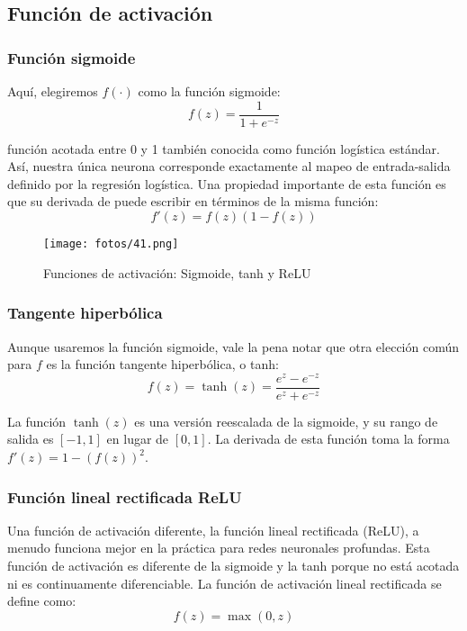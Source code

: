 \subsection{Función de activación}

\subsubsection{Función sigmoide}

\noindent Aquí, elegiremos $f(\cdot)$ como la función sigmoide:
\begin{equation}
f(z) = \frac{1}{1 + e^{-z}}
\end{equation}

\noindent función acotada entre 0 y 1 también conocida como función logística estándar. Así, nuestra única neurona corresponde exactamente al mapeo de entrada-salida definido por la regresión logística. Una propiedad importante de esta función es que su derivada de puede escribir en términos de la misma función:
\begin{equation}
f'(z) = f(z)(1 - f(z))
\end{equation}

\begin{figure}[h]
\centering
\texttt{[image: fotos/41.png]}
\caption{Funciones de activación: Sigmoide, tanh y ReLU}
\label{fig:7.2}
\end{figure}

\subsubsection{Tangente hiperbólica}

Aunque usaremos la función sigmoide, vale la pena notar que otra elección común para $f$ es la función tangente hiperbólica, o tanh:
\begin{equation}
f(z) = \tanh(z) = \frac{e^{z} - e^{-z}}{e^{z} + e^{-z}}
\end{equation}

La función $\tanh(z)$ es una versión reescalada de la sigmoide, y su rango de salida es $[-1, 1]$ en lugar de $[0,1]$. La derivada de esta función toma la forma $f'(z) = 1 - (f(z))^2$. 

\subsubsection{Función lineal rectificada ReLU}

Una función de activación diferente, la función lineal rectificada (ReLU), a menudo funciona mejor en la práctica para redes neuronales profundas. Esta función de activación es diferente de la sigmoide y la tanh porque no está acotada ni es continuamente diferenciable. La función de activación lineal rectificada se define como:
\begin{equation}
f(z) = \max(0, z)
\end{equation}

